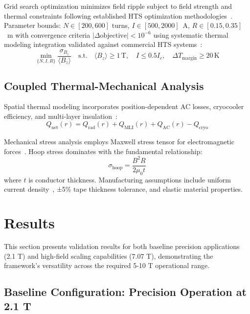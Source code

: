 \documentclass[10pt,twocolumn]{article}
\begin{document}
Grid search optimization minimizes field ripple subject to field strength and thermal constraints following established HTS optimization methodologies~\cite{iwasa2009cryogenic}. Parameter bounds: $N \in [200,600]$ turns, $I \in [500,2000]$~A, $R \in [0.15,0.35]$~m with convergence criteria $|\Delta \text{objective}| < 10^{-6}$ using systematic thermal modeling integration validated against commercial HTS systems~\cite{hahn2019}:
\begin{equation}
\min_{\{N,I,R\}} \frac{\sigma_{B_z}}{\langle B_z \rangle} \quad \text{s.t.} \quad \langle B_z \rangle \geq 1\,\text{T}, \quad I \leq 0.5 I_c, \quad \Delta T_{\text{margin}} \geq 20\,\text{K}
\end{equation}

\subsection{Coupled Thermal-Mechanical Analysis}

Spatial thermal modeling incorporates position-dependent AC losses, cryocooler efficiency, and multi-layer insulation~\cite{iwasa2009cryogenic}:
\begin{equation}
Q_{\text{net}}(r) = Q_{\text{rad}}(r) + Q_{\text{MLI}}(r) + Q_{\text{AC}}(r) - Q_{\text{cryo}}
\end{equation}

Mechanical stress analysis employs Maxwell stress tensor for electromagnetic forces~\cite{zhou2023}. Hoop stress dominates with the fundamental relationship:
\begin{equation}
\sigma_{\text{hoop}} = \frac{B^2R}{2\mu_0 t}
\label{eq:hoop_stress}
\end{equation}
where $t$ is conductor thickness. Manufacturing assumptions include uniform current density~\cite{superpower2022}, ±5\% tape thickness tolerance, and elastic material properties.

\section{Results}

This section presents validation results for both baseline precision applications (2.1 T) and high-field scaling capabilities (7.07 T), demonstrating the framework's versatility across the required 5-10 T operational range.

\subsection{Baseline Configuration: Precision Operation at 2.1 T}
\end{document}
